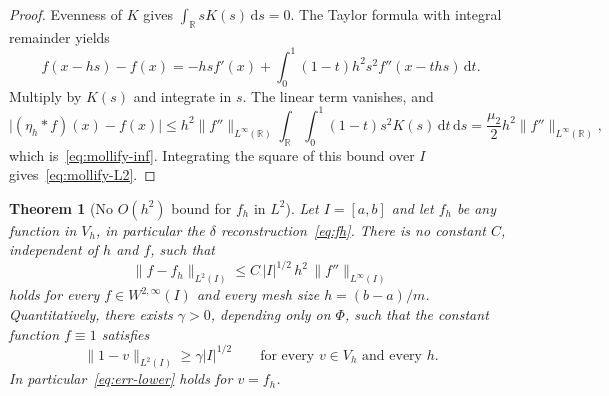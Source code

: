 \documentclass[final,3p,times]{elsarticle}
\theoremstyle{plain}
\newtheorem{theorem}{Theorem}
\theoremstyle{definition}
\theoremstyle{remark}
\newcommand{\dziti}{\ensuremath{\delta}\text{-Ziti}}
\newcommand{\dd}{\mathrm{d}}
\begin{document}
\begin{proof}
Evenness of $K$ gives $\int_{\mathbb{R}}s K(s)\,\dd s=0$. The Taylor formula
with integral remainder yields
\begin{equation}
f(x-hs)-f(x)
=-hs f'(x)
+\int_0^1(1-t)h^2 s^2 f''(x-ths)\,\dd t.
\end{equation}
Multiply by $K(s)$ and integrate in $s$. The linear term vanishes, and
\begin{equation}
\bigl\lvert(\eta_h*f)(x)-f(x)\bigr\rvert
\le
h^2\lVert f''\rVert_{L^\infty(\mathbb{R})}
\int_{\mathbb{R}}\int_0^1(1-t)s^2 K(s)\,\dd t\,\dd s
=\frac{\mu_2}{2}h^2\lVert f''\rVert_{L^\infty(\mathbb{R})},
\end{equation}
which is~\eqref{eq:mollify-inf}. Integrating the square of this bound over
$I$ gives~\eqref{eq:mollify-L2}.
\end{proof}

\begin{theorem}[No $O(h^2)$ bound for $f_h$ in $L^2$]
\label{thm:error}
Let $I=[a,b]$ and let $f_h$ be any function in $V_h$, in particular the
\dziti{} reconstruction~\eqref{eq:fh}. There is no constant $C$, independent
of $h$ and $f$, such that
\begin{equation}
\label{eq:err-false}
\lVert f-f_h\rVert_{L^2(I)}
\le
C\,\lvert I\rvert^{1/2}\,h^2\,\lVert f''\rVert_{L^\infty(I)}
\end{equation}
holds for every $f\in W^{2,\infty}(I)$ and every mesh size $h=(b-a)/m$.
Quantitatively, there exists $\gamma>0$, depending only on $\Phi$, such that
the constant function $f\equiv 1$ satisfies
\begin{equation}
\label{eq:err-lower}
\lVert 1-v\rVert_{L^2(I)}
\ge
\gamma\lvert I\rvert^{1/2}
\qquad\text{for every }v\in V_h\text{ and every }h.
\end{equation}
In particular~\eqref{eq:err-lower} holds for $v=f_h$.
\end{theorem}
\end{document}
